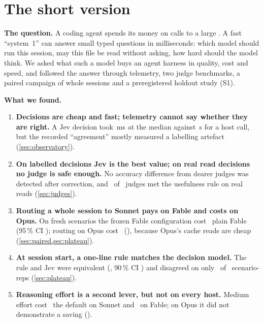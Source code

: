 \section*{The short version}\label{sec:short}

\textbf{The question.} A coding agent spends its money on calls to a large . A fast ``system~1''
 can answer small typed questions in milliseconds: which model should run this session, may this
file be read without asking, how hard should the model think. We asked what such a model buys an agent harness in
quality, cost and speed, and followed the answer through telemetry, two judge benchmarks, a paired campaign of whole
sessions and a preregistered holdout study (S1).

\textbf{What we found.}
\begin{enumerate}[leftmargin=1.5em, itemsep=2pt]
  \item \textbf{Decisions are cheap and fast; telemetry cannot say whether they are right.} A Jev decision took
    \ObJevPfifty\,ms at the median against \ObHostPfifty\,s for a host call, but the recorded ``agreement'' mostly
    measured a labelling artefact (\cref{sec:observatory}).
  \item \textbf{On labelled decisions Jev is the best value; on real read decisions no judge is safe enough.}
    No accuracy difference from dearer judges was detected after correction, and \TrNUseful\ of \NumBase\ judges met
    the usefulness rule on real reads (\cref{sec:judges}).
  \item \textbf{Routing a whole session to Sonnet pays on Fable and costs on Opus.} On fresh scenarios the frozen
    Fable configuration cost \SHOneRatio\X\ plain Fable (95\,\% CI \SHOneCI); routing on Opus cost \SHFiveRatio\X\
    (\SHFiveCI), because Opus's cache reads are cheap (\cref{sec:paired,sec:plateau}).
  \item \textbf{At session start, a one-line rule matches the decision model.} The rule and Jev were equivalent
    (\SHTwoRatio\X, 90\,\% CI \SHTwoCINinety) and disagreed on only \SHTwoDisc\ of \SHTwoReps\ scenario-reps
    (\cref{sec:plateau}).
  \item \textbf{Reasoning effort is a second lever, but not on every host.} Medium effort cost \EcRatio\X\ the default
    on Sonnet and \EfRatio\X\ on Fable; on Opus it did not demonstrate a saving (\SHFourRatio\X).
\end{enumerate}

